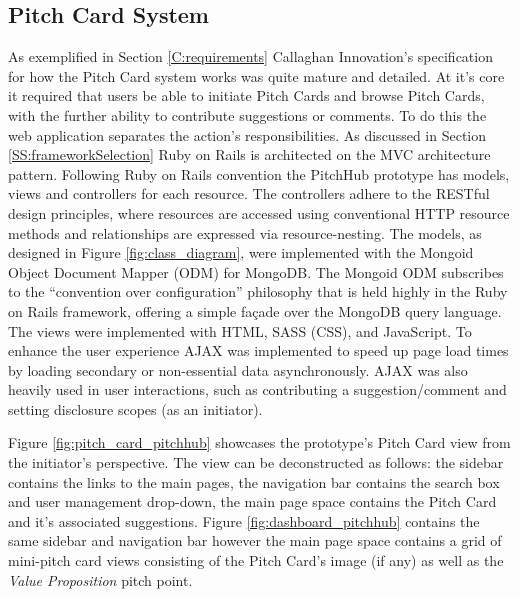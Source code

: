 \subsection{Pitch Card System}
As exemplified in Section \ref{C:requirements} Callaghan Innovation's specification for how the Pitch Card system works was quite mature and detailed. At it's core it required that users be able to initiate Pitch Cards and browse Pitch Cards, with the further ability to contribute suggestions or comments. To do this the web application separates the action's responsibilities. As discussed in Section \ref{SS:frameworkSelection} Ruby on Rails is architected on the MVC architecture pattern. Following Ruby on Rails convention the PitchHub prototype has models, views and controllers for each resource. The controllers adhere to the RESTful design principles, where resources are accessed using conventional HTTP resource methods and relationships are expressed via resource-nesting. The models, as designed in Figure \ref{fig:class_diagram}, were implemented with the Mongoid \cite{Mongo4:online} Object Document Mapper (ODM) for MongoDB. The Mongoid ODM subscribes to the ``convention over configuration'' philosophy that is held highly in the Ruby on Rails framework, offering a simple fa\c{c}ade over the MongoDB query language. The views were implemented with HTML, SASS (CSS), and JavaScript. To enhance the user experience AJAX was implemented to speed up page load times by loading secondary or non-essential data asynchronously. AJAX was also heavily used in user interactions, such as contributing a suggestion/comment and setting disclosure scopes (as an initiator).
\par
Figure \ref{fig:pitch_card_pitchhub} showcases the prototype's Pitch Card view from the initiator's perspective. The view can be deconstructed as follows: the sidebar contains the links to the main pages, the navigation bar contains the search box and user management drop-down, the main page space contains the Pitch Card and it's associated suggestions. Figure \ref{fig:dashboard_pitchhub} contains the same sidebar and navigation bar however the main page space contains a grid of mini-pitch card views consisting of the Pitch Card's image (if any) as well as the \textit{Value Proposition} pitch point.

